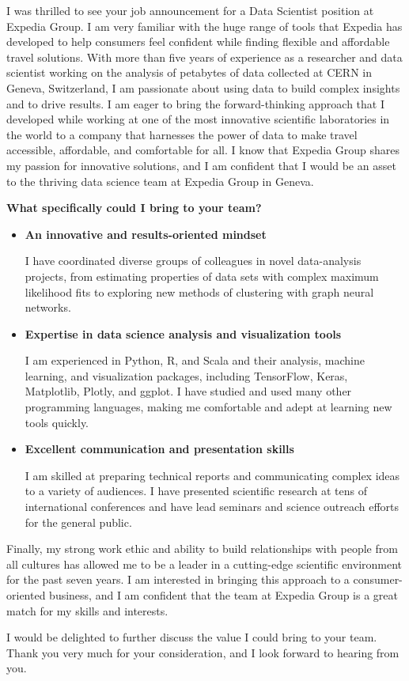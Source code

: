 \documentclass[10pt,stdletter,dateno]{newlfm}
\begin{document}
\begin{newlfm}

I was thrilled to see your job announcement for a Data Scientist position at Expedia Group. 
I am very familiar with the huge range of tools that Expedia has developed to help consumers feel confident while
finding flexible and affordable travel solutions.
With more than five years of experience as a researcher and data scientist working on the analysis of petabytes of data 
collected at CERN in Geneva, Switzerland, I am passionate about using data to build
complex insights and to drive results.
I am eager to bring the forward-thinking approach
that I developed while working at one of the most innovative scientific laboratories in the world to a company
that harnesses the power of data to make travel accessible, affordable, and comfortable for all.
I know that Expedia Group shares my passion for innovative solutions, and I am confident that I would be
an asset to the thriving data science team at Expedia Group in Geneva.

\textbf{What specifically could I bring to your team?}

\begin{itemize}
    \item \textbf{An innovative and results-oriented mindset}

    I have coordinated diverse groups of colleagues in novel data-analysis projects,
    from estimating properties of data sets with complex maximum likelihood fits to exploring new methods of clustering 
    with graph neural networks.

    \item \textbf{Expertise in data science analysis and visualization tools}  

    I am experienced in Python, R, and Scala and their analysis, machine learning,  and visualization packages,
    including TensorFlow, Keras, Matplotlib, Plotly, and ggplot.
    I have studied and used many other programming languages, making me comfortable and adept at learning new tools quickly.

    \item \textbf{Excellent communication and presentation skills}
        
    I am skilled at preparing technical reports and communicating complex ideas to a variety of audiences. 
    I have presented scientific research at tens of international conferences and have lead seminars and science outreach efforts for the general public.

\end{itemize}

Finally, my strong work ethic and ability to build relationships with people from all cultures has allowed me to
be a leader in a cutting-edge scientific environment for the past seven years. I am interested in bringing this
approach to a consumer-oriented business, and I am confident that the team at Expedia Group is a great match for my skills and interests.


I would be delighted to further discuss the value I could bring to your team. Thank you very much 
for your consideration, and I look forward to hearing from you.
\end{newlfm}
\end{document}
